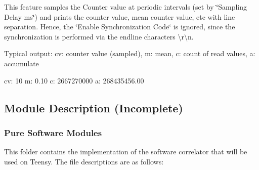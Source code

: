 This feature samples the Counter value at periodic intervals (set by {\ttfamily \char`\"{}\+Sampling Delay ms\char`\"{}}) and prints the counter value, mean counter value, etc with line separation. Hence, the {\ttfamily \char`\"{}\+Enable Synchronization Code\char`\"{}} is ignored, since the synchronization is performed via the endline characters {\ttfamily \textbackslash{}r\textbackslash{}n}.

Typical output\+: cv\+: counter value (sampled), m\+: mean, c\+: count of read values, a\+: accumulate


\begin{DoxyCode}
cv: 10  m: 0.10  c: 2667270000  a: 268435456.00
\end{DoxyCode}


\subsection*{Module Description ({\ttfamily Incomplete})}

\subsubsection*{Pure Software Modules}

This folder contains the implementation of the software correlator that will be used on Teensy. The file descriptions are as follows\+:


